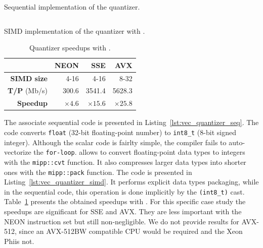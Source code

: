 \begin{listing}[htp]
  \inputminted[frame=lines,linenos]{C++}{main/chapter3/src/quantizer/quantizer_seq.cpp}
  \caption{Sequential implementation of the quantizer.}
  \label{lst:vec_quantizer_seq}
\end{listing}

\begin{listing}[htp]
  \inputminted[frame=lines,linenos]{C++}{main/chapter3/src/quantizer/quantizer_simd.cpp}
  \caption{SIMD implementation of the quantizer with \MIPP.}
  \label{lst:vec_quantizer_simd}
\end{listing}

\begin{table}[htp]
  \centering
  \caption{Quantizer speedups with \MIPP.}
  \label{tab:vec_quantizer_speedup}
  \begin{tabular}{r | r  r r}
                      & \textbf{NEON} & \textbf{SSE}  & \textbf{AVX}  \\ \hline \hline
  \textbf{SIMD size}  & 4-16          & 4-16          & 8-32          \\ %
  \textbf{T/P} (Mb/s) & 300.6         & 3541.4        & 5628.3        \\ %
  \textbf{Speedup}    & $\times 4.6$  & $\times 15.6$ & $\times 25.8$ \\
  \end{tabular}
\end{table}

The associate sequential code is presented in
Listing~\ref{lst:vec_quantizer_seq}. The code converts \verb|float| (32-bit
floating-point number) to \verb|int8_t| (8-bit signed integer). Although the
scalar code is fairlty simple, the compiler fails to auto-vectorize the
\verb|for-loop|. \MIPP allows to convert floating-point data types to integers
with the \verb|mipp::cvt| function. It also compresses larger data types into
shorter ones with the \verb|mipp::pack| function. The \MIPP code is presented in
Listing~\ref{lst:vec_quantizer_simd}. It performs explicit data types packaging,
while in the sequential code, this operation is done implicitly by the
\verb|(int8_t)| cast. Table~\ref{tab:vec_quantizer_speedup} presents the
obtained speedups with \MIPP. For this specific case study the speedups are
significant for SSE and AVX. They are less important with the NEON instruction
set but still non-negligible. We do not provide results for AVX-512, since an
AVX-512BW compatible CPU would be required and the Xeon Phi\TM is not.

